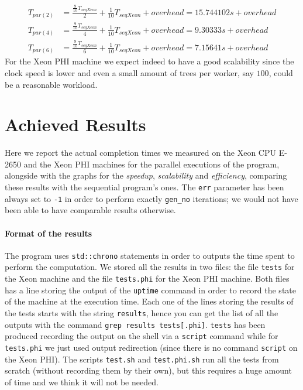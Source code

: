 \documentclass[10pt]{article}
\numberwithin{equation}{section}
\begin{document}
\begin{align}
	T_{par\left(2\right)} &= \frac{\frac{9}{10} T_{seqXeon}}{2} + \frac{1}{10} T_{seqXeon} + overhead = 15.744102s + overhead\\
	T_{par\left(4\right)} &= \frac{\frac{9}{10} T_{seqXeon}}{4} + \frac{1}{10} T_{seqXeon} + overhead = 9.30333s + overhead\\
	T_{par\left(6\right)} &= \frac{\frac{9}{10} T_{seqXeon}}{6} + \frac{1}{10} T_{seqXeon} + overhead = 7.15641s + overhead
\end{align}
For the Xeon PHI machine we expect indeed to have a good scalability since the clock speed is lower and even a small amount of trees per worker, say $100$, could be a reasonable workload.

\section{Achieved Results}
Here we report the actual completion times we measured on the Xeon CPU E-2650 and the Xeon PHI machines for the parallel executions of the program, alongside with the graphs for the \emph{speedup}, \emph{scalability} and \emph{efficiency}, comparing these results with the sequential program's ones. The \verb|err| parameter has been always set to \verb|-1| in order to perform exactly \verb|gen_no| iterations; we would not have been able to have comparable results otherwise.
\paragraph{Format of the results}
The program uses \verb|std::chrono| statements in order to outputs the time spent to perform the computation. We stored all the results in two files: the file \verb|tests| for the Xeon machine and the file \verb|tests.phi| for the Xeon PHI machine. Both files has a line storing the output of the \verb|uptime| command in order to record the state of the machine at the execution time. Each one of the lines storing the results of the tests starts with the string \verb|results|, hence you can get the list of all the outputs with the command \verb|grep results tests[.phi]|. \verb|tests| has been produced recording the output on the shell via a \verb|script| command while for \verb|tests.phi| we just used output redirection (since there is no command \verb|script| on the Xeon PHI). The scripts \verb|test.sh| and \verb|test.phi.sh| run all the tests from scratch (without recording them by their own), but this requires a huge amount of time and we think it will not be needed.
\end{document}
